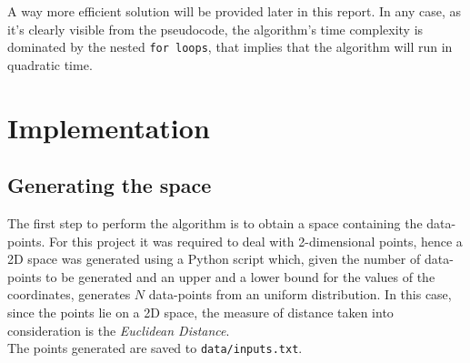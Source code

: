 \documentclass[12pt, letterpaper]{article}  %
\begin{document}
A way more efficient solution will be provided later in this report. In any case, as it's clearly visible from the pseudocode, the algorithm's time complexity is dominated by the nested \texttt{for loops}, that implies that the algorithm will run in quadratic time.

\section{Implementation}
\subsection{Generating the space}
The first step to perform the algorithm is to obtain a space containing the data-points. For this project it was required to deal with 2-dimensional points, hence a 2D space was generated using a Python script which, given the number of data-points to be generated and an upper and a lower bound for the values of the coordinates, generates $N$ data-points from an uniform distribution. In this case, since the points lie on a 2D space, the measure of distance taken into consideration is the \textit{Euclidean Distance}.\\
The points generated are saved to \texttt{data/inputs.txt}.
\end{document}
